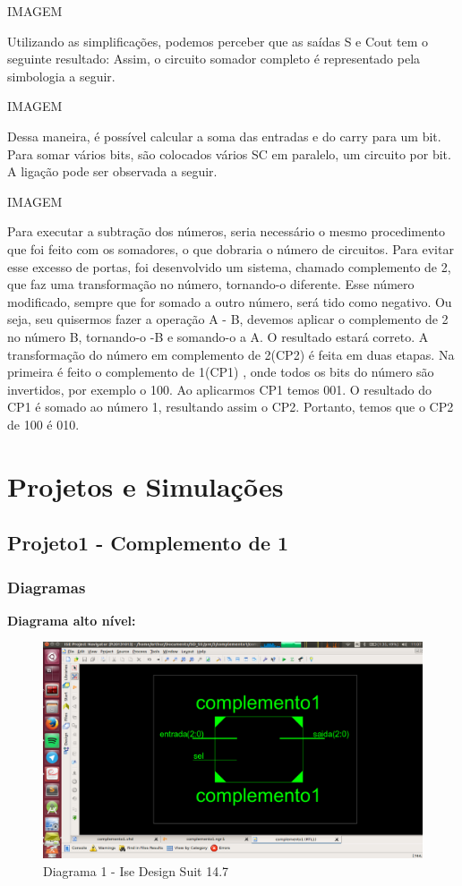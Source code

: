 \documentclass[12pts]{article}
\begin{document}
IMAGEM


Utilizando as simplificações, podemos perceber que as saídas S e Cout tem o seguinte resultado:
Assim, o circuito somador completo é representado pela simbologia a seguir.

IMAGEM

Dessa maneira, é possível calcular a soma das entradas e do carry para um bit.
Para somar vários bits, são colocados vários SC em paralelo, um circuito por bit. A ligação pode ser observada a seguir.

IMAGEM

Para executar a subtração dos números, seria necessário o mesmo procedimento que foi feito com os somadores, o que dobraria o número de circuitos. Para evitar esse excesso de portas, foi desenvolvido um sistema, chamado complemento de 2, que faz uma transformação no número, tornando-o diferente. Esse número modificado, sempre que for somado a outro número, será tido como negativo. Ou seja, seu quisermos fazer a operação A - B, devemos aplicar o complemento de 2 no número B, tornando-o -B e somando-o a A. O resultado estará correto.
A transformação do número em complemento de 2(CP2) é feita em duas etapas. Na primeira é feito o complemento de 1(CP1) , onde todos os bits do número são invertidos, por exemplo o 100. Ao aplicarmos CP1 temos 001. O resultado do CP1 é somado ao número 1, resultando assim o CP2. Portanto, temos que o CP2 de 100 é 010.

\newpage

\section{Projetos e Simulações}
\subsection{Projeto1 - Complemento de 1}
\subsubsection{Diagramas}

\textbf{Diagrama alto nível:}

\begin{figure}[!htb]
  \centering
  \includegraphics[scale=0.3	]{imagens/complementoSc1}
  \caption{Diagrama 1 - Ise Design Suit 14.7}
  \label{figRotulo}
\end{figure}
\end{document}
